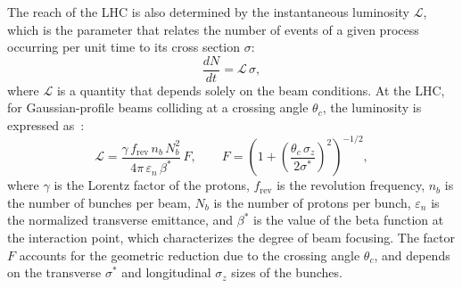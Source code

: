 The reach of the LHC is also determined by the instantaneous luminosity $\mathcal{L}$, which is the parameter that relates the number of events of a given process occurring per unit time to its cross section $\sigma$:
\begin{equation}
    \frac{dN}{dt} = \mathcal{L}\,\sigma,
    \label{eq:event_rate}
\end{equation}
where $\mathcal{L}$ is a quantity that depends solely on the beam conditions. At the LHC, for Gaussian-profile beams colliding at a crossing angle $\theta_c$, the luminosity is expressed as~\cite{Bruning:2004ej}:
\begin{equation}
    \mathcal{L} = \frac{\gamma\, f_\text{rev}\, n_b\, N_b^2}{4\pi\, \varepsilon_n\, \beta^*}\, F, \qquad F = \left(1+\left(\frac{\theta_c\,\sigma_z}{2\sigma^*}\right)^2\right)^{-1/2},
    \label{eq:lumi}
\end{equation}
where $\gamma$ is the Lorentz factor of the protons, $f_\text{rev}$ is the revolution frequency, $n_b$ is the number of bunches per beam, $N_b$ is the number of protons per bunch, $\varepsilon_n$ is the normalized transverse emittance, and $\beta^*$ is the value of the beta function at the interaction point, which characterizes the degree of beam focusing. The factor $F$ accounts for the geometric reduction due to the crossing angle $\theta_c$, and depends on the transverse $\sigma^*$ and longitudinal $\sigma_z$ sizes of the bunches.
%

